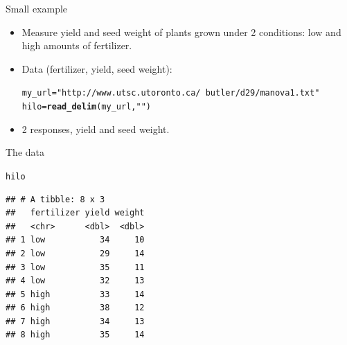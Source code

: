 \documentclass[unknownkeysallowed]{beamer}\usepackage[]{graphicx}\usepackage[]{color}
\makeatletter
\newcommand{\hlstr}[1]{\textcolor[rgb]{0.192,0.494,0.8}{#1}}%
\newcommand{\hlstd}[1]{\textcolor[rgb]{0.345,0.345,0.345}{#1}}%
\newcommand{\hlkwb}[1]{\textcolor[rgb]{0.69,0.353,0.396}{#1}}%
\newcommand{\hlkwd}[1]{\textcolor[rgb]{0.737,0.353,0.396}{\textbf{#1}}}%
\newenvironment{kframe}{%
 \def\at@end@of@kframe{}%
 \ifinner\ifhmode%
  \def\at@end@of@kframe{\end{minipage}}%
  \begin{minipage}{\columnwidth}%
 \fi\fi%
 \def\FrameCommand##1{\hskip\@totalleftmargin \hskip-\fboxsep
 \colorbox{shadecolor}{##1}\hskip-\fboxsep
     \hskip-\linewidth \hskip-\@totalleftmargin \hskip\columnwidth}%
 \MakeFramed {\advance\hsize-\width
   \@totalleftmargin\z@ \linewidth\hsize
   \@setminipage}}%
 {\par\unskip\endMakeFramed%
 \at@end@of@kframe}
\newenvironment{knitrout}{}{} %
\makeatother
\begin{document}
\begin{frame}[fragile]{Small example}

  \begin{itemize}
  \item Measure yield and seed weight of plants grown under 2 conditions: low and high amounts of fertilizer.
  \item Data (fertilizer, yield, seed weight):

 
\begin{knitrout}
\color{fgcolor}\begin{kframe}
\begin{alltt}
\hlstd{my_url}\hlkwb{=}\hlstr{"http://www.utsc.utoronto.ca/~butler/d29/manova1.txt"}
\hlstd{hilo}\hlkwb{=}\hlkwd{read_delim}\hlstd{(my_url,}\hlstr{" "}\hlstd{)}
\end{alltt}


{\ttfamily\noindent\itshape\color{messagecolor}{\#\# Parsed with column specification:\\\#\# cols(\\\#\#\ \  fertilizer = col\_character(),\\\#\#\ \  yield = col\_double(),\\\#\#\ \  weight = col\_double()\\\#\# )}}\end{kframe}
\end{knitrout}

  \item 2 responses, yield and seed weight.
  \end{itemize}
  
\end{frame}

\begin{frame}[fragile]{The data}
  
\begin{knitrout}
\color{fgcolor}\begin{kframe}
\begin{alltt}
\hlstd{hilo}
\end{alltt}
\begin{verbatim}
## # A tibble: 8 x 3
##   fertilizer yield weight
##   <chr>      <dbl>  <dbl>
## 1 low           34     10
## 2 low           29     14
## 3 low           35     11
## 4 low           32     13
## 5 high          33     14
## 6 high          38     12
## 7 high          34     13
## 8 high          35     14
\end{verbatim}
\end{kframe}
\end{knitrout}
  
\end{frame}
\end{document}
